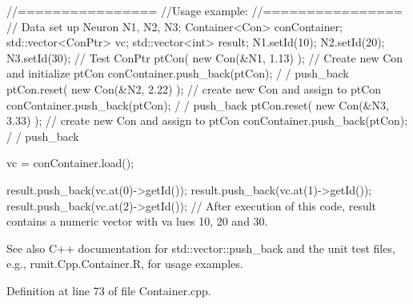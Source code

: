 \begin{DoxyCode}
                //================
                //Usage example:
                //================
                // Data set up
                        Neuron N1, N2, N3;
                        Container<Con> conContainer;
                        std::vector<ConPtr> vc;
                        std::vector<int> result;
                        N1.setId(10);
                        N2.setId(20);
                        N3.setId(30);
                // Test
                        ConPtr ptCon( new Con(&N1, 1.13) );     // Create new Con
       and initialize ptCon
                        conContainer.push_back(ptCon);                          /
      / push_back
                        ptCon.reset(  new Con(&N2, 2.22) );             // create
       new Con and assign to ptCon
                        conContainer.push_back(ptCon);                          /
      / push_back
                        ptCon.reset(  new Con(&N3, 3.33) );             // create
       new Con and assign to ptCon
                        conContainer.push_back(ptCon);                          /
      / push_back

                        vc = conContainer.load();

                        result.push_back(vc.at(0)->getId());
                        result.push_back(vc.at(1)->getId());
                        result.push_back(vc.at(2)->getId());
        // After execution of this code, result contains a numeric vector with va
      lues 10, 20 and 30.
\end{DoxyCode}


\begin{DoxySeeAlso}{See also}
C++ documentation for std::vector::push\_\-back and the unit test files, e.g., runit.Cpp.Container.R, for usage examples. 
\end{DoxySeeAlso}


Definition at line 73 of file Container.cpp.


